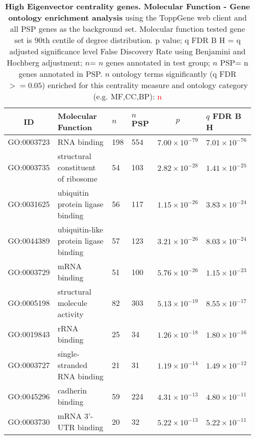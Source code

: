   \begin{table}[ht]
\centering
\begin{adjustbox}{width=\textwidth}
\setlength{\extrarowheight}{2pt}
\begin{tabular}{@{}clllcl@{}}
  \toprule
  ID & Molecular Function & $n$ & $n$ PSP & $p$ & $q$ FDR B H \\ 

  \midrule
GO:0003723 & RNA binding & 198 & 554 & $7.00 \times 10^{-79}$ & $7.01 \times 10^{-76}$ \\ 
  GO:0003735 & structural constituent of ribosome & 54 & 103 & $2.82 \times 10^{-28}$ & $1.41 \times 10^{-25}$ \\ 
  GO:0031625 & ubiquitin protein ligase binding & 56 & 117 & $1.15 \times 10^{-26}$ & $3.83 \times 10^{-24}$ \\ 
  GO:0044389 & ubiquitin-like protein ligase binding & 57 & 123 & $3.21 \times 10^{-26}$ & $8.03 \times 10^{-24}$ \\ 
  GO:0003729 & mRNA binding & 51 & 100 & $5.76 \times 10^{-26}$ & $1.15 \times 10^{-23}$ \\ 
  GO:0005198 & structural molecule activity & 82 & 303 & $5.13 \times 10^{-19}$ & $8.55 \times 10^{-17}$ \\ 
  GO:0019843 & rRNA binding & 25 & 34 & $1.26 \times 10^{-18}$ & $1.80 \times 10^{-16}$ \\ 
  GO:0003727 & single-stranded RNA binding & 21 & 31 & $1.19 \times 10^{-14}$ & $1.49 \times 10^{-12}$ \\ 
  GO:0045296 & cadherin binding & 59 & 224 & $4.31 \times 10^{-13}$ & $4.80 \times 10^{-11}$ \\ 
  GO:0003730 & mRNA 3'-UTR binding & 20 & 32 & $5.22 \times 10^{-13}$ & $5.22 \times 10^{-11}$ \\ 
   \hline
\end{tabular}
\end{adjustbox}

\caption[Gene ontology enrichment High Eigenvector centrality genes Molecular Function of genes above 90th centile of distribution]{\textbf{High Eigenvector centrality genes. Molecular Function - Gene ontology enrichment analysis} using the ToppGene web client and all PSP genes as the background set.  Molecular function tested gene set is 90th centile of degree distribution.  p value; q FDR B H = q adjusted significance level False Discovery Rate using Benjamini and Hochberg adjustment; $n$= $n$ genes annotated in test group; $n$ PSP= n genes annotated in PSP. $n$ ontology terms significantly (q FDR$>=0.05$) enriched for this centrality measure and ontology category (e.g. MF,CC,BP): \textcolor{red}{n}} 
\label{tab:ToppGENE GO: Molecular Function. 90 centile cw psp eig.txtp = p value; q FDR B H = q adjusted significance level False Discovery Rate using Benjamini and Hochberg adjustment; n= n genes annotated in test group; n PSP= n genes annotated in PSP}
\end{table}

